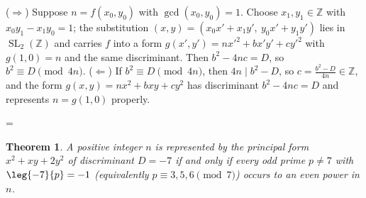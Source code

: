 \documentclass[11pt]{article}
\makeatletter
\theoremstyle{ntstyle}
\newtheorem{theorem}{Theorem}[subsection]
\let\nt@closedisplay\]
\def\nt@guardedclose{\@ifnextchar\par{\nt@closeafterpar}{\@ifnextchar\end{\postdisplaypenalty\@M\nt@closedisplay}{\nt@closedisplay}}}
\def\nt@closeafterpar\par{\@ifnextchar\par{\nt@closeafterpar}{\@ifnextchar\end{\postdisplaypenalty\@M\nt@closedisplay\par}{\nt@closedisplay\par}}}
\renewenvironment{proof}[1][\proofname]{\par
  \pushQED{\qed}\normalfont\topsep\medskipamount\edef\nt@afterproof{\@endparpenalty=\the\@endparpenalty\relax}\@beginparpenalty\@M\@endparpenalty\@M\let\]\nt@guardedclose\trivlist\item[]\textit{#1\@addpunct{.}} \ignorespaces}{\ifvmode\addpenalty\@M\fi\popQED\nt@afterproof\endtrivlist\@endpefalse}
\makeatother
\begin{document}
\begin{proof} ($\Rightarrow$) Suppose $n = f(x_0, y_0)$
	with $\gcd(x_0, y_0) = 1$. Choose $x_1, y_1 \in \mathbb{Z}$ with $x_0
		y_1 - x_1 y_0 = 1$; the substitution $(x, y) = (x_0 x' + x_1 y',\ y_0
		x' + y_1 y')$ lies in $\operatorname{SL}_2(\mathbb{Z})$ and carries
	$f$ into a form $g(x', y') = n x'^{2} + b x'y' + c y'^{2}$ with $g(1,
		0) = n$ and the same discriminant. Then $b^{2} - 4nc = D$, so $b^{2}
		\equiv D \pmod{4n}$. ($\Leftarrow$) If $b^{2} \equiv D \pmod{4n}$,
	then $4n \mid b^{2} - D$, so $c = \tfrac{b^{2} - D}{4n} \in
		\mathbb{Z}$, and the form $g(x, y) = n x^{2} + b xy + c y^{2}$ has
	discriminant $b^{2} - 4nc = D$ and represents $n = g(1, 0)$ properly.\qedhere

\end{proof}

\begin{theorem}\label{thm:8.6.7} A positive integer $n$ is represented by the
	principal form $x^{2} + xy + 2y^{2}$ of discriminant $D = -7$ if and
	only if every odd prime $p\neq 7$ with $\leg{-7}{p} = -1$
	(equivalently $p \equiv 3, 5, 6 \pmod{7}$) occurs to an even power in $n$.

\end{theorem}
\end{document}
